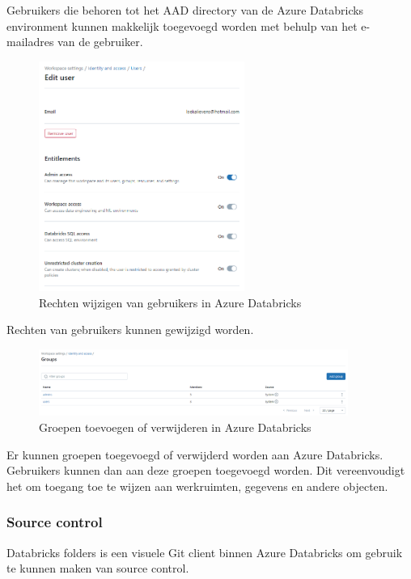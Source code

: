 Gebruikers die behoren tot het AAD directory van de Azure Databricks environment kunnen makkelijk toegevoegd worden met behulp van het e-mailadres van de gebruiker.

\begin{figure}[H]
    \centering
    \includegraphics[width=0.6\textwidth]{./graphics/databricks/management_permissions_2.png}
    \caption{Rechten wijzigen van gebruikers in Azure Databricks}
\end{figure}

Rechten van gebruikers kunnen gewijzigd worden.

\begin{figure}[H]
    \centering
    \includegraphics[width=0.9\textwidth]{./graphics/databricks/management_permissions_3.png}
    \caption{Groepen toevoegen of verwijderen in Azure Databricks}
\end{figure}

Er kunnen groepen toegevoegd of verwijderd worden aan Azure Databricks. Gebruikers kunnen dan aan deze groepen toegevoegd worden. Dit vereenvoudigt het om toegang toe te wijzen aan werkruimten, gegevens en andere objecten.

\subsubsection{Source control}

Databricks folders is een visuele Git client binnen Azure Databricks om gebruik te kunnen maken van source control.


